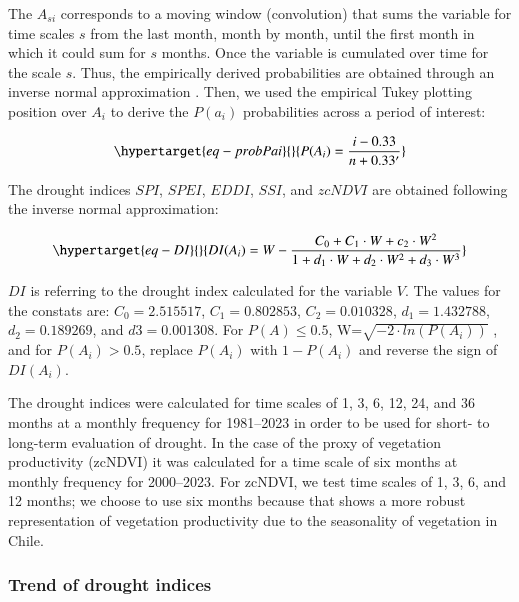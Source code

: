 \documentclass[
  authoryear,
  preprint,
  3p,
  onecolumn]{elsarticle}
\begin{document}
The \(A_{si}\) corresponds to a moving window (convolution) that sums
the variable for time scales \(s\) from the last month, month by month,
until the first month in which it could sum for \(s\) months. Once the
variable is cumulated over time for the scale \(s\). Thus, the
empirically derived probabilities are obtained through an inverse normal
approximation \citep{Abramowitz1968}. Then, we used the empirical Tukey
plotting position \citep{Wilks2011} over \(A_i\) to derive the
\(P(a_i)\) probabilities across a period of interest:

\begin{equation}\protect\hypertarget{eq-probPai}{}{P(A_i) = \frac{i-0.33}{n+0.33'}}\label{eq-probPai}\end{equation}

The drought indices \(SPI\), \(SPEI\), \(EDDI\), \(SSI\), and \(zcNDVI\)
are obtained following the inverse normal approximation:

\begin{equation}\protect\hypertarget{eq-DI}{}{DI(A_i) = W - \frac{C_0+C_1\cdot W + c_2 \cdot W^2}{1+d_1\cdot W +d_2\cdot W^2 +d_3\cdot W^3}}\label{eq-DI}\end{equation}

\(DI\) is referring to the drought index calculated for the variable
\(V\). The values for the constats are: \(C_0 = 2.515517\),
\(C_1 = 0.802853\), \(C_2 = 0.010328\), \(d_1 = 1.432788\),
\(d_2 = 0.189269\), and \(d3 = 0.001308\). For \(P(A) \leq 0.5\),
W=\(\sqrt{-2\cdot ln(P(A_i))}\) , and for \(P(A_i) > 0.5\), replace
\(P(A_i)\) with \(1-P(A_i)\) and reverse the sign of \(DI(A_i)\).

The drought indices were calculated for time scales of 1, 3, 6, 12, 24,
and 36 months at a monthly frequency for 1981--2023 in order to be used
for short- to long-term evaluation of drought. In the case of the proxy
of vegetation productivity (zcNDVI) it was calculated for a time scale
of six months at monthly frequency for 2000--2023. For zcNDVI, we test
time scales of 1, 3, 6, and 12 months; we choose to use six months
because that shows a more robust representation of vegetation
productivity due to the seasonality of vegetation in Chile.

\hypertarget{trend-of-drought-indices}{%
\subsubsection{Trend of drought
indices}\label{trend-of-drought-indices}}
\end{document}

